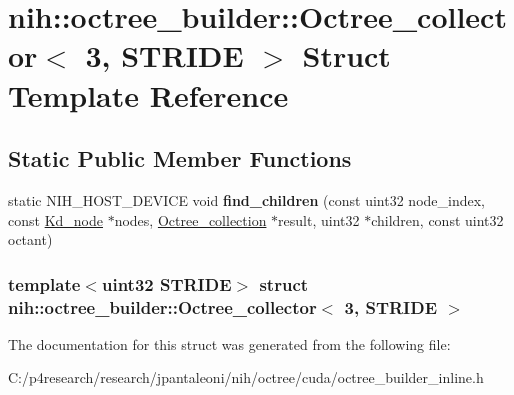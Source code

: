 \hypertarget{structnih_1_1octree__builder_1_1_octree__collector_3_013_00_01_s_t_r_i_d_e_01_4}{
\section{nih\-:\-:octree\-\_\-builder\-:\-:\-Octree\-\_\-collector$<$ 3, \-S\-T\-R\-I\-D\-E $>$ \-Struct \-Template \-Reference}
\label{structnih_1_1octree__builder_1_1_octree__collector_3_013_00_01_s_t_r_i_d_e_01_4}
}
\subsection*{\-Static \-Public \-Member \-Functions}
\begin{DoxyCompactItemize}
\item 
\hypertarget{structnih_1_1octree__builder_1_1_octree__collector_3_013_00_01_s_t_r_i_d_e_01_4_a71048b15407d500222934f16e665f912}{
static \-N\-I\-H\-\_\-\-H\-O\-S\-T\-\_\-\-D\-E\-V\-I\-C\-E void {\bfseries find\-\_\-children} (const uint32 node\-\_\-index, const \hyperlink{structnih_1_1_bintree__node}{\-Kd\-\_\-node} $\ast$nodes, \hyperlink{structnih_1_1octree__builder_1_1_octree__collection}{\-Octree\-\_\-collection} $\ast$result, uint32 $\ast$children, const uint32 octant)}
\label{structnih_1_1octree__builder_1_1_octree__collector_3_013_00_01_s_t_r_i_d_e_01_4_a71048b15407d500222934f16e665f912}

\end{DoxyCompactItemize}
\subsubsection*{template$<$uint32 \-S\-T\-R\-I\-D\-E$>$ struct nih\-::octree\-\_\-builder\-::\-Octree\-\_\-collector$<$ 3, S\-T\-R\-I\-D\-E $>$}



\-The documentation for this struct was generated from the following file\-:\begin{DoxyCompactItemize}
\item 
\-C\-:/p4research/research/jpantaleoni/nih/octree/cuda/octree\-\_\-builder\-\_\-inline.\-h\end{DoxyCompactItemize}
